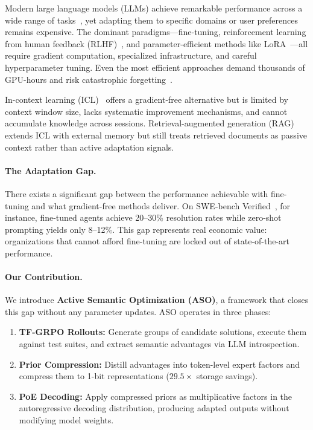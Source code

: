 \documentclass[11pt]{article}
\begin{document}
Modern large language models (LLMs) achieve remarkable performance across a wide
range of tasks~\cite{brown2020language, openai2023gpt4, anthropic2024claude},
yet adapting them to specific domains or user preferences remains expensive. The
dominant paradigms---fine-tuning, reinforcement learning from human feedback
(RLHF)~\cite{ouyang2022training}, and parameter-efficient methods like
LoRA~\cite{hu2022lora}---all require gradient computation, specialized
infrastructure, and careful hyperparameter tuning. Even the most efficient
approaches demand thousands of GPU-hours and risk catastrophic
forgetting~\cite{kirkpatrick2017overcoming}.

In-context learning (ICL)~\cite{brown2020language} offers a gradient-free
alternative but is limited by context window size, lacks systematic improvement
mechanisms, and cannot accumulate knowledge across sessions. Retrieval-augmented
generation (RAG)~\cite{lewis2020retrieval} extends ICL with external memory but
still treats retrieved documents as passive context rather than active adaptation
signals.

\paragraph{The Adaptation Gap.}
There exists a significant gap between the performance achievable with
fine-tuning and what gradient-free methods deliver. On SWE-bench
Verified~\cite{jimenez2024swebench}, for instance, fine-tuned agents achieve
20--30\% resolution rates while zero-shot prompting yields only 8--12\%. This
gap represents real economic value: organizations that cannot afford fine-tuning
are locked out of state-of-the-art performance.

\paragraph{Our Contribution.}
We introduce \textbf{Active Semantic Optimization (ASO)}, a framework that
closes this gap without any parameter updates. ASO operates in three phases:

\begin{enumerate}[leftmargin=1.5em]
    \item \textbf{TF-GRPO Rollouts:} Generate groups of candidate solutions,
          execute them against test suites, and extract semantic advantages via
          LLM introspection.
    \item \textbf{Prior Compression:} Distill advantages into token-level expert
          factors and compress them to 1-bit representations ($29.5\times$
          storage savings).
    \item \textbf{PoE Decoding:} Apply compressed priors as multiplicative
          factors in the autoregressive decoding distribution, producing adapted
          outputs without modifying model weights.
\end{enumerate}
\end{document}
